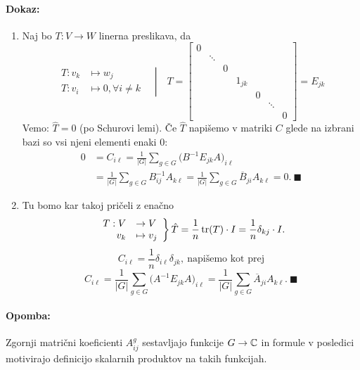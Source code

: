 \paragraph{Dokaz:}
\begin{enumerate}
	\item{Naj bo $T : V \to W$ linerna preslikava, da
		\[
			\left.\begin{array}{rl}
				T : v_k &\mapsto w_j \\
				T : v_i &\mapsto 0, \forall i\neq k
			\end{array}\quad \right|\quad T = \begin{bmatrix}
				0 &        &   &        &   &        & \\
				  & \ddots &   &        &   &        & \\
				  &        & 0 &        &   &        & \\
				  &        &   & 1_{jk} &   &        & \\
				  &        &   &        & 0 &        & \\
				  &        &   &        &   & \ddots & \\
				  &        &   &        &   &        & 0
			\end{bmatrix} = E_{jk}
		\]
		Vemo: $\hat{T}= 0$ (po Schurovi lemi). \v Ce $\hat{T}$ napi\v semo v matriki $C$ glede na izbrani
		bazi so vsi njeni elementi enaki $0$:
		\begin{align*}
			0 &= C_{i\ell} = \frac{1}{|G|}\sum_{g \in G} \Big(B^{-1}E_{jk}A\Big)_{i\ell} \\
			&= \frac{1}{|G|}\sum_{g \in G} B^{-1}_{ij} A_{k\ell} = \frac{1}{|G|}\sum_{g \in G} \overline{B}_{ji} A_{k\ell} = 0.\
			\blacksquare
		\end{align*}}
	\item{Tu bomo kar takoj pri\v celi z ena\v cno
		\[
		\left.\begin{array}{rl}
			T : V &\to V \\
			 v_k & \mapsto v_j
		\end{array}\right\} \hat{T} = \frac{1}{n} \operatorname{tr}(T) \cdot I = \frac{1}{n}\delta_{kj}\cdot I.
		\]
		\[
			C_{i\ell} = \frac{1}{n}\delta_{i\ell}\delta_{jk},\ \text{napi\v semo kot prej}
		\]
		\[
			C_{i\ell} = \frac{1}{|G|}\sum_{g \in G}\Big(A^{-1}E_{jk}A\Big)_{i\ell} = \frac{1}{|G|}\sum_{g \in G}
				\overline{A}_{ji} A_{k\ell}.\ \blacksquare
		\]
		}
\end{enumerate}

\paragraph{Opomba:} Zgornji matri\v cni koeficienti $A^g_{ij}$ sestavljajo funkcije $G \to \mathbb{C}$ in formule v posledici motivirajo definicijo
skalarnih produktov na takih funkcijah.

